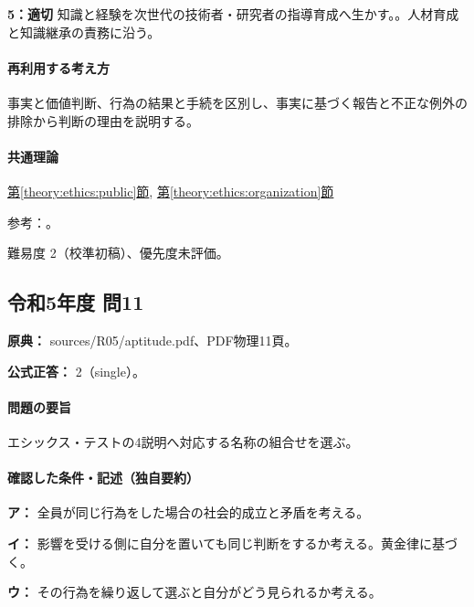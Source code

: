 \noindent\textbf{5：適切} 知識と経験を次世代の技術者・研究者の指導育成へ生かす。。人材育成と知識継承の責務に沿う。\par

\paragraph{再利用する考え方} 事実と価値判断、行為の結果と手続を区別し、事実に基づく報告と不正な例外の排除から判断の理由を説明する。

\paragraph{共通理論} \hyperref[theory:ethics:public]{第\ref*{theory:ethics:public}節}, \hyperref[theory:ethics:organization]{第\ref*{theory:ethics:organization}節}

\par 参考：\cite{ipej_ethics2011,mext_misconduct2014}。

\par 難易度 2（校準初稿）、優先度未評価。

\subsection{令和5年度 問11}
\label{q:r05-reg-apt-11}

\noindent\textbf{原典：} sources/R05/aptitude.pdf、PDF物理11頁。

\textbf{公式正答：} 2（single）。

\paragraph{問題の要旨} エシックス・テストの4説明へ対応する名称の組合せを選ぶ。

\paragraph{確認した条件・記述（独自要約）}\mbox{}\par

\noindent\textbf{ア：} 全員が同じ行為をした場合の社会的成立と矛盾を考える。\par

\noindent\textbf{イ：} 影響を受ける側に自分を置いても同じ判断をするか考える。黄金律に基づく。\par

\noindent\textbf{ウ：} その行為を繰り返して選ぶと自分がどう見られるか考える。\par

